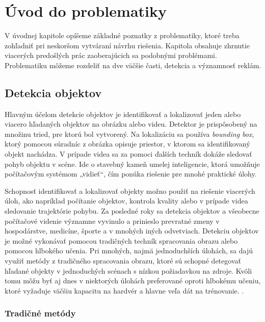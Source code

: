 \chapter{Úvod do problematiky}\label{chap:overview}

V úvodnej kapitole opíšeme základné poznatky z problematiky, ktoré treba zohľadniť pri neskoršom vytváraní návrhu riešenia. Kapitola obsahuje zhrnutie viacerých predošlých prác zaoberajúcich sa podobnými problémami. Problematiku môžeme rozdeliť na dve väčšie časti, detekcia a významnosť reklám.


\section{Detekcia objektov}

Hlavným účelom detekcie objektov je identifikovať a lokalizovať jeden alebo viacero hľadaných objektov na obrázku alebo videu. Detektor je prispôsobený na množinu tried, pre ktorú bol vytvorený. Na lokalizáciu sa používa \textit{bounding box}, ktorý pomocou súradníc z obrázka opisuje priestor, v ktorom sa identifikovaný objekt nachádza. V prípade videa sa za pomoci ďalších techník dokáže sledovať pohyb objektu v scéne. Ide o stavebný kameň umelej inteligencie, ktorá umožňuje počítačovým systémom „vidieť“, čím ponúka riešenie pre mnohé praktické úlohy.

Schopnosť identifikovať a lokalizovať objekty možno použiť na riešenie viacerých úloh, ako napríklad počítanie objektov, kontrola kvality alebo v prípade videa sledovanie trajektórie pohybu. Za posledné roky sa detekcia objektov a všeobecne počítačové videnie významne vyvinulo a prinieslo prevratné zmeny v hospodárstve, medicíne, športe a v mnohých iných odvetviach. Detekciu objektov je možné vykonávať pomocou tradičných techník spracovania obrazu alebo pomocou hlbokého učenia. Pri mnohých, najmä jednoduchších úlohách, sa dajú využiť metódy z tradičného spracovania obrazu, ktoré sú schopné detegovať hľadané objekty v jednoduchých scénach s nízkou požiadavkou na zdroje. Kvôli tomu môžu byť aj dnes v niektorých úlohách preferované oproti hlbokému učeniu, ktoré vyžaduje väčšiu kapacitu na hardvér a hlavne veľa dát na trénovanie. \cite{CV-vs-DL}.

\subsection{Tradičné metódy}

